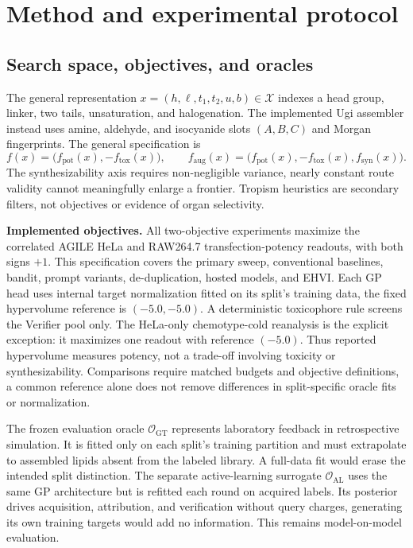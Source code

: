 \documentclass[11pt]{article}
\begin{document}
\section{Method and experimental protocol}
\label{sec:method}
\subsection{Search space, objectives, and oracles}
\label{sec:objectives}
The general representation $x=(h,\ell,t_1,t_2,u,b)\in\mathcal X$ indexes a head group, linker, two tails, unsaturation, and halogenation. The implemented Ugi assembler instead uses amine, aldehyde, and isocyanide slots $(A,B,C)$ and Morgan fingerprints. The general specification is
\begin{equation}
 f(x)=\bigl(f_{\mathrm{pot}}(x),-f_{\mathrm{tox}}(x)\bigr),\qquad
 f_{\mathrm{aug}}(x)=\bigl(f_{\mathrm{pot}}(x),-f_{\mathrm{tox}}(x),f_{\mathrm{syn}}(x)\bigr).
 \label{eq:objectives}
\end{equation}
The synthesizability axis requires non-negligible variance, nearly constant route validity cannot meaningfully enlarge a frontier. Tropism heuristics are secondary filters, not objectives or evidence of organ selectivity.

\textbf{Implemented objectives.} All two-objective experiments maximize the correlated AGILE HeLa and RAW264.7 transfection-potency readouts, with both signs $+1$. This specification covers the primary sweep, conventional baselines, bandit, prompt variants, de-duplication, hosted models, and EHVI. Each GP head uses internal target normalization fitted on its split's training data, the fixed hypervolume reference is $(-5.0,-5.0)$. A deterministic toxicophore rule screens the Verifier pool only. The HeLa-only chemotype-cold reanalysis is the explicit exception: it maximizes one readout with reference $(-5.0)$. Thus reported hypervolume measures potency, not a trade-off involving toxicity or synthesizability. Comparisons require matched budgets and objective definitions, a common reference alone does not remove differences in split-specific oracle fits or normalization.

The frozen evaluation oracle $\mathcal O_{\mathrm{GT}}$ represents laboratory feedback in retrospective simulation. It is fitted only on each split's training partition and must extrapolate to assembled lipids absent from the labeled library. A full-data fit would erase the intended split distinction. The separate active-learning surrogate $\mathcal O_{\mathrm{AL}}$ uses the same GP architecture but is refitted each round on acquired labels. Its posterior drives acquisition, attribution, and verification without query charges, generating its own training targets would add no information. This remains model-on-model evaluation.
\end{document}
